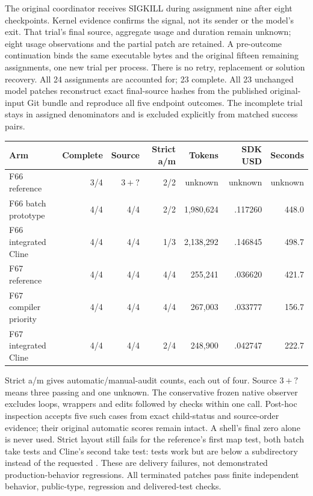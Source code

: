 \documentclass[11pt,a4paper]{article}
\newcommand{\code}[1]{\texttt{\detokenize{#1}}}
\begin{document}
The original coordinator receives SIGKILL during assignment nine after eight
checkpoints. Kernel evidence confirms the signal, not its sender or the model's
exit. That trial's final source, aggregate usage and duration remain unknown;
eight usage observations and the partial patch are retained. A pre-outcome
continuation binds the same executable bytes and the original fifteen remaining
assignments, one new trial per process. There is no retry, replacement or solution
recovery. All 24 assignments are accounted for; 23 complete. All 23 unchanged model
patches reconstruct exact final-source hashes from the published original-input
Git bundle and reproduce all five endpoint outcomes. The incomplete trial stays
in assigned denominators and is excluded explicitly from matched success pairs.

\begin{center}\small
\begin{tabular}{lrrrrrr}\toprule
Arm & Complete & Source & Strict a/m & Tokens & SDK USD & Seconds \\\midrule
F66 reference & 3/4 & $3+?$ & 2/2 & unknown & unknown & unknown \\
F66 batch prototype & 4/4 & 4/4 & 2/2 & 1,980,624 & .117260 & 448.0 \\
F66 integrated Cline & 4/4 & 4/4 & 1/3 & 2,138,292 & .146845 & 498.7 \\
F67 reference & 4/4 & 4/4 & 4/4 & 255,241 & .036620 & 421.7 \\
F67 compiler priority & 4/4 & 4/4 & 4/4 & 267,003 & .033777 & 156.7 \\
F67 integrated Cline & 4/4 & 4/4 & 2/4 & 248,900 & .042747 & 222.7 \\\bottomrule
\end{tabular}
\end{center}
Strict a/m gives automatic/manual-audit counts, each out of four. Source $3+?$
means three passing and one unknown. The conservative frozen native observer
excludes loops, \code{cd} wrappers and edits followed by checks within one call.
Post-hoc inspection accepts five such cases from exact child-status and source-order
evidence; their original automatic scores remain intact. A shell's final zero
alone is never used. Strict layout still fails for the reference's first map test,
both batch take tests and Cline's second take test: tests work but are below a
subdirectory instead of the requested \code{src/*.test.ts}. These are delivery
failures, not demonstrated production-behavior regressions. All terminated patches
pass finite independent behavior, public-type, regression and delivered-test checks.
\end{document}
